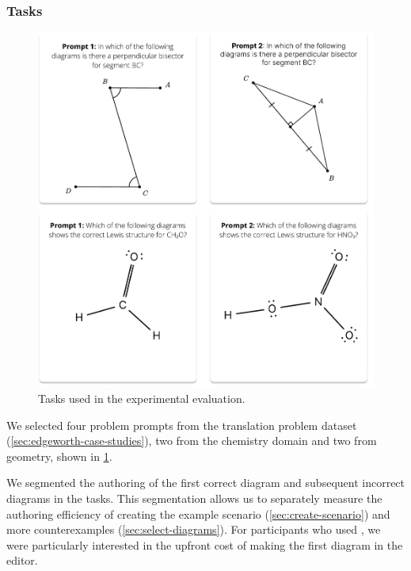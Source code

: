 \subsubsection{Tasks}
\label{sec:edgeworth-user-tasks}

\begin{figure}
    \centering
    \includegraphics[width=\linewidth]{assets/edgeworth-eval/user-study-tasks.pdf}
    \caption{Tasks used in the \Edgeworth experimental evaluation.}
    \label{fig:edgeworth-user-study-tasks}
\end{figure}

We selected four problem prompts from the translation problem dataset (\cref{sec:edgeworth-case-studies}), two from the chemistry domain and two from geometry, shown in \cref{fig:edgeworth-user-study-tasks}.

We segmented the authoring of the first correct diagram and subsequent incorrect diagrams in the tasks. This segmentation allows us to separately measure the authoring efficiency of creating the example scenario (\cref{sec:create-scenario}) and more counterexamples (\cref{sec:select-diagrams}). For participants who used \Edgeworth, we were particularly interested in the upfront cost of making the first \Substance diagram in the \Penrose editor. 

